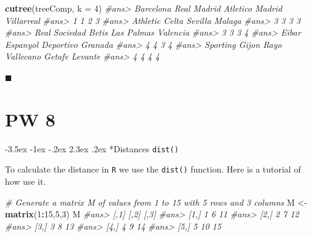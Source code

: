 \documentclass[]{book}
\makeatletter
\newenvironment{Shaded}{\begin{snugshade}}{\end{snugshade}}
\newcommand{\KeywordTok}[1]{\textcolor[rgb]{0.13,0.29,0.53}{\textbf{#1}}}
\newcommand{\DataTypeTok}[1]{\textcolor[rgb]{0.13,0.29,0.53}{#1}}
\newcommand{\DecValTok}[1]{\textcolor[rgb]{0.00,0.00,0.81}{#1}}
\newcommand{\StringTok}[1]{\textcolor[rgb]{0.31,0.60,0.02}{#1}}
\newcommand{\CommentTok}[1]{\textcolor[rgb]{0.56,0.35,0.01}{\textit{#1}}}
\newcommand{\OperatorTok}[1]{\textcolor[rgb]{0.81,0.36,0.00}{\textbf{#1}}}
\newcommand{\NormalTok}[1]{#1}
\renewcommand\section{\@startsection {section}{1}{\z@}%
                                   {-3.5ex \@plus -1ex \@minus -.2ex}%
                                   {2.3ex \@plus.2ex}%
                                   {\normalfont\Large\bfseries\color{ForestGreen}}}
\theoremstyle{definition}
\theoremstyle{definition}
\theoremstyle{definition}
\theoremstyle{remark}
\makeatother
\begin{document}
\begin{Shaded}
\begin{Highlighting}[]
\KeywordTok{cutree}\NormalTok{(treeComp, }\DataTypeTok{k =} \DecValTok{4}\NormalTok{) }
\CommentTok{#ans>       Barcelona     Real Madrid Atletico Madrid      Villarreal }
\CommentTok{#ans>               1               1               2               3 }
\CommentTok{#ans>        Athletic           Celta         Sevilla          Malaga }
\CommentTok{#ans>               3               3               3               3 }
\CommentTok{#ans>   Real Sociedad           Betis      Las Palmas        Valencia }
\CommentTok{#ans>               3               3               3               4 }
\CommentTok{#ans>           Eibar        Espanyol       Deportivo         Granada }
\CommentTok{#ans>               4               4               3               4 }
\CommentTok{#ans>  Sporting Gijon  Rayo Vallecano          Getafe         Levante }
\CommentTok{#ans>               4               4               4               4}
\end{Highlighting}
\end{Shaded}

◼

\chapter*{PW 8}\label{pw-8}

\section*{\texorpdfstring{Distances
\texttt{dist()}}{Distances dist()}}\label{distances-dist}

To calculate the distance in \texttt{R} we use the \texttt{dist()}
function. Here is a tutorial of how use it.

\begin{Shaded}
\begin{Highlighting}[]
\CommentTok{# Generate a matrix M of values from 1 to 15 with 5 rows and 3 columns}
\NormalTok{M <-}\StringTok{ }\KeywordTok{matrix}\NormalTok{(}\DecValTok{1}\OperatorTok{:}\DecValTok{15}\NormalTok{,}\DecValTok{5}\NormalTok{,}\DecValTok{3}\NormalTok{)}
\NormalTok{M}
\CommentTok{#ans>      [,1] [,2] [,3]}
\CommentTok{#ans> [1,]    1    6   11}
\CommentTok{#ans> [2,]    2    7   12}
\CommentTok{#ans> [3,]    3    8   13}
\CommentTok{#ans> [4,]    4    9   14}
\CommentTok{#ans> [5,]    5   10   15}
\end{Highlighting}
\end{Shaded}
\end{document}

